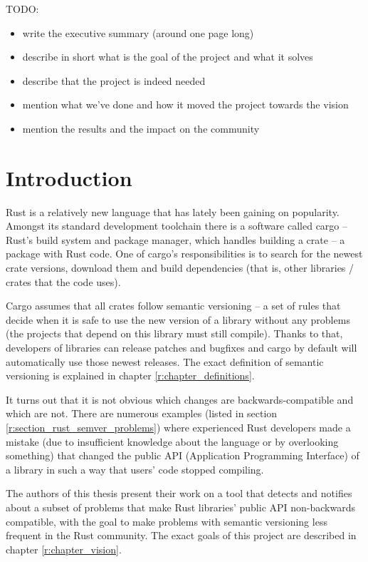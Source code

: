 \documentclass[licencjacka,en]{pracamgr}
\begin{document}
TODO:
\begin{itemize}
	\item write the executive summary (around one page long)
	\item describe in short what is the goal of the project and what it solves
	\item describe that the project is indeed needed
	\item mention what we've done and how it moved the project towards the vision
	\item mention the results and the impact on the community
\end{itemize}

\chapter*{Introduction}

Rust is a relatively new language that has lately been gaining on popularity. Amongst its standard
development toolchain there is a software called cargo -- Rust's build system and package manager,
which handles building a crate -- a package with Rust code. One of cargo's responsibilities is to
search for the newest crate versions, download them and build dependencies (that is, other
libraries / crates that the code uses).

Cargo assumes that all crates follow semantic versioning -- a set of rules that decide when it is
safe to use the new version of a library without any problems (the projects that depend on this
library must still compile). Thanks to that, developers of libraries can release patches and
bugfixes and cargo by default will automatically use those newest releases. The exact definition of
semantic versioning is explained in chapter \ref{r:chapter_definitions}.

It turns out that it is not obvious which changes are backwards-compatible and which are not.
There are numerous examples (listed in section \ref{r:section_rust_semver_problems})
where experienced Rust developers made a mistake (due to insufficient knowledge about the language
or by overlooking something) that changed the public API (Application Programming Interface)
of a library in such a way that users' code stopped compiling.

The authors of this thesis present their work on a tool that detects and notifies about a subset of
problems that make Rust libraries' public API non-backwards compatible, with the goal to make
problems with semantic versioning less frequent in the Rust community. The exact goals of this
project are described in chapter \ref{r:chapter_vision}.
\end{document}
